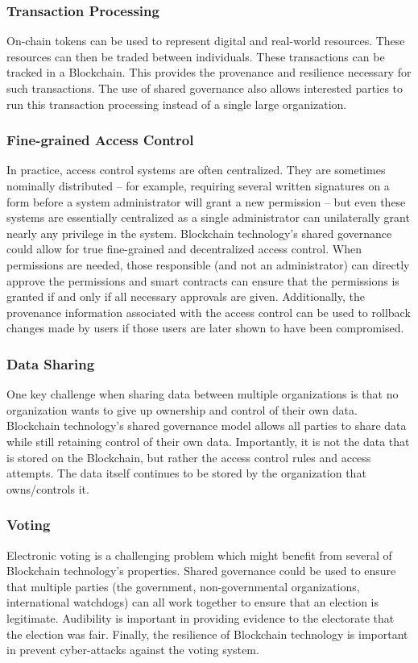 \subsubsection{Transaction Processing}
On-chain tokens can be used to represent digital and real-world resources.
These resources can then be traded between individuals.
These transactions can be tracked in a Blockchain.
This provides the provenance and resilience necessary for such transactions.
The use of shared governance also allows interested parties to run this transaction processing instead of a single large organization.

\subsubsection{Fine-grained Access Control}
In practice, access control systems are often centralized. They are sometimes nominally distributed -- for example, requiring several written signatures on a form before a system administrator will grant a new permission -- but even these systems are essentially centralized as a single administrator can unilaterally grant nearly any privilege in the system.
Blockchain technology's shared governance could allow for true fine-grained and decentralized access control.
When permissions are needed, those responsible (and not an administrator) can directly approve the permissions and smart contracts can ensure that the permissions is granted if and only if all necessary approvals are given.
Additionally, the provenance information associated with the access control can be used to rollback changes made by users if those users are later shown to have been compromised.

\subsubsection{Data Sharing}
One key challenge when sharing data between multiple organizations is that no organization wants to give up ownership and control of their own data.
Blockchain technology's shared governance model allows all parties to share data while still retaining control of their own data.
Importantly, it is not the data that is stored on the Blockchain, but rather the access control rules and access attempts.
The data itself continues to be stored by the organization that owns/controls it.

\subsubsection{Voting}
Electronic voting is a challenging problem which might benefit from several of Blockchain technology's properties.
Shared governance could be used to ensure that multiple parties (the government, non-governmental organizations, international watchdogs) can all work together to ensure that an election is legitimate.
Audibility is important in providing evidence to the electorate that the election was fair.
Finally, the resilience of Blockchain technology is important in prevent cyber-attacks against the voting system.

